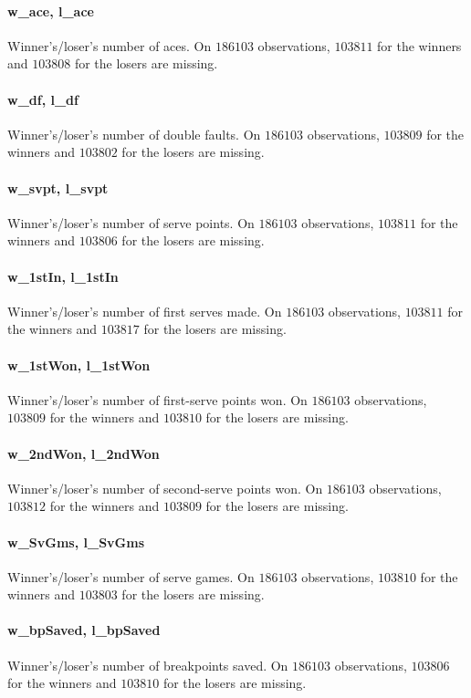 \documentclass{article}
\begin{document}
\paragraph{w\_ace, l\_ace}
Winner's/loser's number of aces. On $186103$ observations, $103811$ for the winners and $103808$ for the losers are missing.

\paragraph{w\_df, l\_df}
Winner's/loser's number of double faults. On $186103$ observations, $103809$ for the winners and $103802$ for the losers are missing.

\paragraph{w\_svpt, l\_svpt}
Winner's/loser's number of serve points. On $186103$ observations, $103811$ for the winners and $103806$ for the losers are missing.

\paragraph{w\_1stIn, l\_1stIn}
Winner's/loser's number of first serves made. On $186103$ observations, $103811$ for the winners and $103817$ for the losers are missing.

\paragraph{w\_1stWon, l\_1stWon}
Winner's/loser's number of first-serve points won. On $186103$ observations, $103809$ for the winners and $103810$ for the losers are missing.

\paragraph{w\_2ndWon, l\_2ndWon}
Winner's/loser's number of second-serve points won. On $186103$ observations, $103812$ for the winners and $103809$ for the losers are missing.

\paragraph{w\_SvGms, l\_SvGms}
Winner's/loser's number of serve games. On $186103$ observations, $103810$ for the winners and $103803$ for the losers are missing.

\paragraph{w\_bpSaved, l\_bpSaved}
Winner's/loser's number of breakpoints saved. On $186103$ observations, $103806$ for the winners and $103810$ for the losers are missing.
\end{document}
